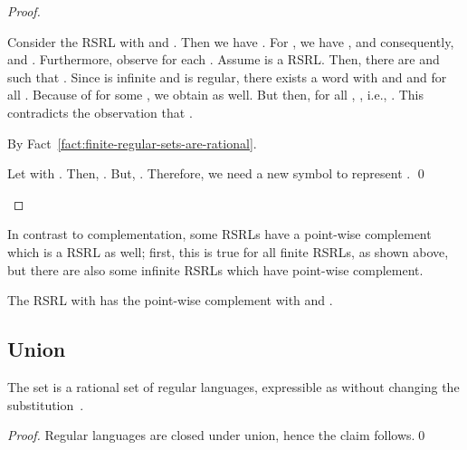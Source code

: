\documentclass[envcountsame]{llncs}
\newcommand{\RegularlyGeneratedLanguageSet}{rational set of regular languages\xspace}
\newcommand{\RegularlyGeneratedLanguageSetAbbrev}{RSRL\xspace}
\newcommand{\RegularlyGeneratedLanguageSetsAbbrev}{RSRLs\xspace}
\begin{document}
\begin{proof}
  \begin{inparaenum}[\bfseries(1)]
  \item Consider the \RegularlyGeneratedLanguageSetAbbrev  with  and .
Then we have . 
For , we have , and consequently,
     and
    .
Furthermore, observe  for
    each .
Assume  is a \RegularlyGeneratedLanguageSetAbbrev.  Then,
    there are  and  such that
    .  
Since  is infinite and  is regular, there
    exists a word  with  and  and  for all .
Because of  for
    some , we obtain  as well.
But then, for all , ,
    i.e., .
This contradicts the observation that .
\item By Fact~\ref{fact:finite-regular-sets-are-rational}.
  \item Let  with
    .  Then,
    .
    But, .  Therefore, we need
    a new symbol to represent .  \qed
  \end{inparaenum}
\end{proof}


In contrast to complementation, some \RegularlyGeneratedLanguageSetsAbbrev have a point-wise
complement which is a \RegularlyGeneratedLanguageSetAbbrev as well; first, this is true for
all finite \RegularlyGeneratedLanguageSetsAbbrev, as shown above, but there are also some
infinite \RegularlyGeneratedLanguageSetsAbbrev which have point-wise complement.

\begin{example}
  The \RegularlyGeneratedLanguageSetAbbrev  with
   has the point-wise
  complement
   with  and
  .
\end{example}



\subsection{Union}
\label{sec:union}


\begin{proposition}
  \label{prop:closure:union}
  The set  is a \RegularlyGeneratedLanguageSet,
  expressible as  without changing the
  substitution~.
\end{proposition}

\begin{proof}
  Regular languages are closed under union, hence the claim
  follows.\qed
\end{proof}
\end{document}

